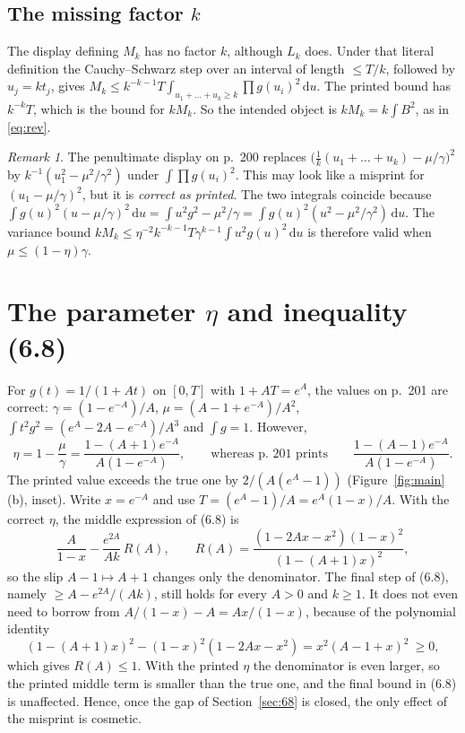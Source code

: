 \documentclass[11pt,a4paper]{amsart}
\theoremstyle{remark}
\newtheorem*{remark}{Remark}
\newcommand{\dd}{\,\mathrm{d}}
\begin{document}
\subsection*{The missing factor \texorpdfstring{$k$}{k}}
The display defining $M_k$ has no factor $k$, although $L_k$ does. Under that literal definition the
Cauchy--Schwarz step over an interval of length $\le T/k$, followed by $u_j=kt_j$, gives
$M_k\le k^{-k-1}T\int_{u_1+\dots+u_k\ge k}\prod g(u_i)^2\dd u$. The printed bound has $k^{-k}T$, which is
the bound for $kM_k$. So the intended object is $kM_k=k\int B^2$, as in \eqref{eq:rev}.

\begin{remark}\label{rem:var}
The penultimate display on p.~200 replaces $\bigl(\tfrac1k(u_1+\dots+u_k)-\mu/\gamma\bigr)^2$ by
$k^{-1}(u_1^2-\mu^2/\gamma^2)$ under $\int\prod g(u_i)^2$. This may look like a misprint for
$(u_1-\mu/\gamma)^2$, but it is \emph{correct as printed}. The two integrals coincide because
$\int g(u)^2(u-\mu/\gamma)^2\dd u=\int u^2g^2-\mu^2/\gamma=\int g(u)^2(u^2-\mu^2/\gamma^2)\dd u$. The
variance bound $kM_k\le\eta^{-2}k^{-k-1}T\gamma^{k-1}\int u^2g(u)^2\dd u$ is therefore valid when
$\mu\le(1-\eta)\gamma$.
\end{remark}

\section{The parameter \texorpdfstring{$\eta$}{eta} and inequality (6.8)}\label{sec:69}

For $g(t)=1/(1+At)$ on $[0,T]$ with $1+AT=e^A$, the values on p.~201 are correct:
$\gamma=(1-e^{-A})/A$, $\mu=(A-1+e^{-A})/A^2$, $\int t^2g^2=(e^A-2A-e^{-A})/A^3$ and $\int g=1$. However,
\[
\eta=1-\frac{\mu}{\gamma}=\frac{1-(A+1)e^{-A}}{A(1-e^{-A})},\qquad\text{whereas p.~201 prints}\qquad
\frac{1-(A-1)e^{-A}}{A(1-e^{-A})}.
\]
The printed value exceeds the true one by $2/(A(e^A-1))$ (Figure~\ref{fig:main}(b), inset). Write
$x=e^{-A}$ and use $T=(e^A-1)/A=e^A(1-x)/A$. With the correct $\eta$, the middle expression of (6.8) is
\begin{equation}\label{eq:68}
\frac{A}{1-x}-\frac{e^{2A}}{Ak}\,R(A),\qquad
R(A)=\frac{(1-2Ax-x^2)(1-x)^2}{(1-(A+1)x)^2},
\end{equation}
so the slip $A-1\mapsto A+1$ changes only the denominator. The final step of (6.8), namely
$\ge A-e^{2A}/(Ak)$, still holds for every $A>0$ and $k\ge1$. It does not even need to borrow from
$A/(1-x)-A=Ax/(1-x)$, because of the polynomial identity
\begin{equation}\label{eq:R}
(1-(A+1)x)^2-(1-x)^2(1-2Ax-x^2)=x^2(A-1+x)^2\ \ge0,
\end{equation}
which gives $R(A)\le1$. With the printed $\eta$ the denominator is even larger, so the printed middle
term is smaller than the true one, and the final bound in (6.8) is unaffected. Hence, once the gap of
Section~\ref{sec:68} is closed, the only effect of the misprint is cosmetic.
\end{document}
